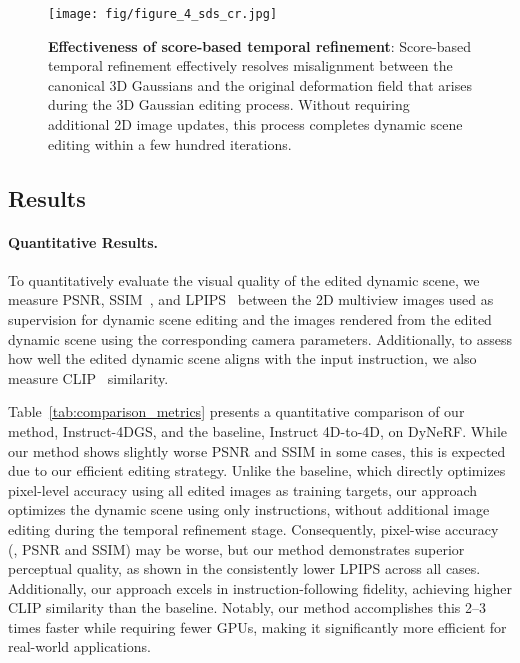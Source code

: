 \begin{figure}[!t]
\centering
    \texttt{[image: fig/figure\_4\_sds\_cr.jpg]}
    \vspace{-7mm}
    \caption{\textbf{Effectiveness of score-based temporal refinement}: Score-based temporal refinement effectively resolves misalignment between the canonical 3D Gaussians and the original deformation field that arises during the 3D Gaussian editing process. Without requiring additional 2D image updates, this process completes dynamic scene editing within a few hundred iterations.}
    \label{fig:scoredistillation}
\vspace{-3mm}
\end{figure}


\vspace{-1mm}
\subsection{Results}
\vspace{-1mm}
\paragraph{Quantitative Results.} 
To quantitatively evaluate the visual quality of the edited dynamic scene, we measure PSNR, SSIM~\cite{ref_38_ssim}, and LPIPS~\cite{ref_39_lpips} between the 2D multiview images used as supervision for dynamic scene editing and the images rendered from the edited dynamic scene using the corresponding camera parameters. Additionally, to assess how well the edited dynamic scene aligns with the input instruction, we also measure CLIP~\cite{ref_40_clip} similarity.

Table~\ref{tab:comparison_metrics} presents a quantitative comparison of our method, Instruct-4DGS, and the baseline, Instruct 4D-to-4D, on DyNeRF. While our method shows slightly worse PSNR and SSIM in some cases, this is expected due to our efficient editing strategy. Unlike the baseline, which directly optimizes pixel-level accuracy using all edited images as training targets, our approach optimizes the dynamic scene using only instructions, without additional image editing during the temporal refinement stage. Consequently, pixel-wise accuracy (\ie, PSNR and SSIM) may be worse, but our method demonstrates superior perceptual quality, as shown in the consistently lower LPIPS across all cases. Additionally, our approach excels in instruction-following fidelity, achieving higher CLIP similarity than the baseline. Notably, our method accomplishes this 2--3 times faster while requiring fewer GPUs, making it significantly more efficient for real-world applications.

